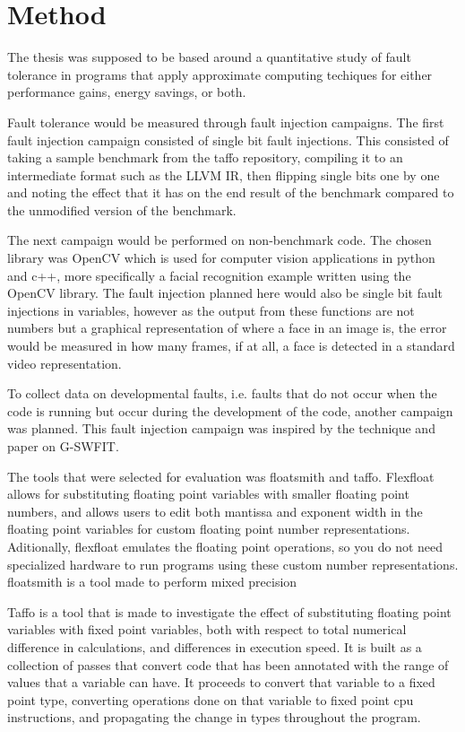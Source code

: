 \section{Method}

The thesis was supposed to be based around a quantitative study of fault tolerance in programs that apply approximate computing techiques for either performance gains, energy savings, or both.

Fault tolerance would be measured through fault injection campaigns.
The first fault injection campaign consisted of single bit fault injections. This consisted of taking a sample benchmark from the taffo repository, compiling it to an intermediate format such as the LLVM IR, then flipping single bits one by one and noting the effect that it has on the end result of the benchmark compared to the unmodified version of the benchmark.

The next campaign would be performed on non-benchmark code. The chosen library was OpenCV which is used for computer vision applications in python and c++, more specifically a facial recognition example written using the OpenCV library. The fault injection planned here would also be single bit fault injections in variables, however as the output from these functions are not numbers but a graphical representation of where a face in an image is, the error would be measured in how many frames, if at all, a face is detected in a standard video representation.

To collect data on developmental faults, i.e. faults that do not occur when the code is running but occur during the development of the code, another campaign was planned. This fault injection campaign was inspired by the technique and paper on G-SWFIT.

The tools that were selected for evaluation was floatsmith and taffo. Flexfloat allows for substituting floating point variables with smaller floating point numbers, and allows users to edit both mantissa and exponent width in the floating point variables for custom floating point number representations. Aditionally, flexfloat emulates the floating point operations, so you do not need specialized hardware to run programs using these custom number representations.
floatsmith is a tool made to perform mixed precision

Taffo is a tool that is made to investigate the effect of substituting floating point variables with fixed point variables, both with respect to total numerical difference in calculations, and differences in execution speed. It is built as a collection of passes that convert code that has been annotated with the range of values that a variable can have. It proceeds to convert that variable to a fixed point type, converting operations done on that variable to fixed point cpu instructions, and propagating the change in types throughout the program.

